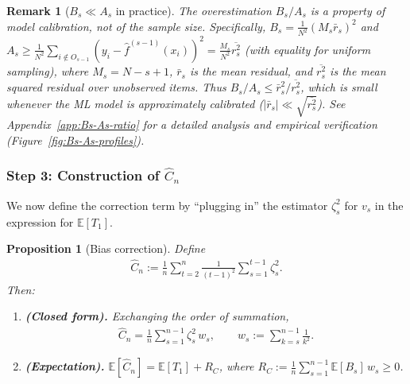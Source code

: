 \documentclass[11pt]{article}
\newtheorem{proposition}[theorem]{Proposition}
\newtheorem{remark}[theorem]{Remark}
\newcommand{\fhat}{\hat{f}}
\newcommand{\Chat}{\hat{C}}
\begin{document}
\begin{remark}[$B_s \ll A_s$ in practice]
\label{rmk:Bs-small}
    The overestimation $B_s/A_s$ is a property of model calibration, not of the sample size. Specifically, $B_s = \frac{1}{N^2}(M_s \bar{r}_s)^2$ and $A_s \geq \frac{1}{N^2}\sum_{i \notin O_{s-1}} (y_i - \fhat^{(s-1)}(x_i))^2 = \frac{M_s}{N^2} \overline{r_s^2}$ (with equality for uniform sampling), where $M_s = N - s + 1$, $\bar{r}_s$ is the mean residual, and $\overline{r_s^2}$ is the mean squared residual over unobserved items. Thus $B_s/A_s \leq \bar{r}_s^2/\overline{r_s^2}$, which is small whenever the ML model is approximately calibrated ($|\bar{r}_s| \ll \sqrt{\overline{r_s^2}}$). See Appendix~\ref{app:Bs-As-ratio} for a detailed analysis and empirical verification (Figure~\ref{fig:Bs-As-profiles}).
\end{remark}

\subsubsection*{Step 3: Construction of $\Chat_n$}

We now define the correction term by ``plugging in'' the estimator $\zeta_s^2$ for $v_s$ in the expression for $\mathbb{E}[T_1]$.

\begin{proposition}[Bias correction]
\label{prop:correction}
    Define
    \begin{align}
    \label{eq:Chat-def}
        \Chat_n := \frac{1}{n}\sum_{t=2}^n \frac{1}{(t-1)^2}\sum_{s=1}^{t-1}\zeta_s^2.
    \end{align}
    Then:
    \begin{enumerate}\renewcommand{\theenumi}{\alph{enumi}}\renewcommand{\labelenumi}{(\theenumi)}
        \item \textbf{(Closed form).} Exchanging the order of summation,
        \begin{align}
        \label{eq:Chat-closed-form}
            \Chat_n = \frac{1}{n}\sum_{s=1}^{n-1}\zeta_s^2 \, w_s, \qquad w_s := \sum_{k=s}^{n-1}\frac{1}{k^2}.
        \end{align}
        \item \textbf{(Expectation).} $\displaystyle\mathbb{E}[\Chat_n] = \mathbb{E}[T_1] + R_C$, where $\displaystyle R_C := \frac{1}{n}\sum_{s=1}^{n-1}\mathbb{E}[B_s]\,w_s \geq 0$.
    \end{enumerate}
\end{proposition}
\end{document}
